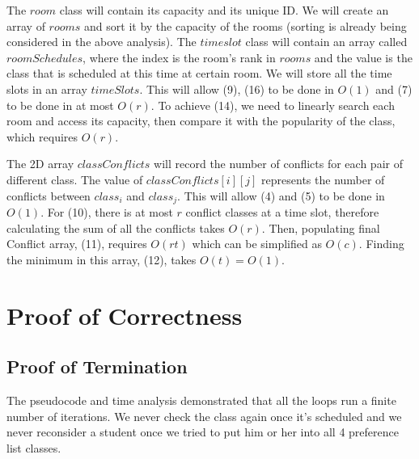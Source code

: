 \documentclass[11pt, oneside]{article}   	%
\begin{document}
The $room$ class will contain its capacity and its unique ID. We will create an array of $rooms$ and sort it by the capacity of the rooms (sorting is already being considered in the above analysis). The $timeslot$ class will contain an array called $roomSchedules$, where the index is the room's rank in $rooms$ and the value is the class that is scheduled at this time at certain room. We will store all the time slots in an array $timeSlots$. This will allow (9), (16) to be done in $O(1)$ and (7) to be done in at most $O(r)$. To achieve (14), we need to linearly search each room and access its capacity, then compare it with the popularity of the class, which requires $O(r)$.

The 2D array $classConflicts$ will record the number of conflicts for each pair of different class. The value of $classConflicts[i][j]$ represents the number of conflicts between $class_i$ and $class_j$. This will allow (4) and (5) to be done in $O(1)$. For (10), there is at most $r$ conflict classes at a time slot, therefore calculating the sum of all the conflicts takes $O(r)$. Then, populating final Conflict array, (11), requires $O(rt)$ which can be simplified as $O(c)$. Finding the minimum in this array, (12), takes $O(t) = O(1)$.

\section{Proof of Correctness}
\subsection{Proof of Termination}
The pseudocode and time analysis demonstrated that all the loops run a finite number of iterations. We never check the class again once it's scheduled and we never reconsider a student once we tried to put him or her into all 4 preference list classes. 
\end{document}
